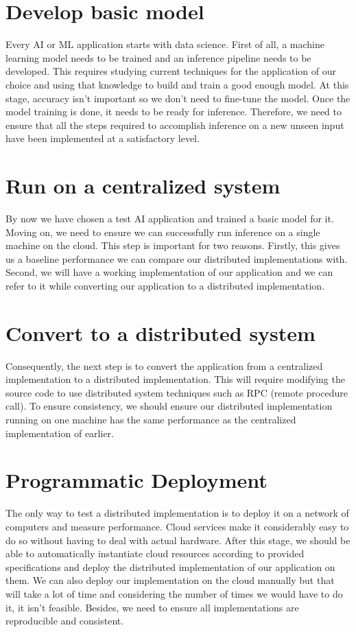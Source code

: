 \documentclass{report}
\begin{document}
\section{Develop basic model}
Every AI or ML application starts with data science. First of all, a machine learning model needs to be trained and an inference pipeline needs to be developed. This requires studying current techniques for the application of our choice and using that knowledge to build and train a good enough model. At this stage, accuracy isn't important so we don't need to fine-tune the model. Once the model training is done, it needs to be ready for inference. Therefore, we need to ensure that all the steps required to accomplish inference on a new unseen input have been implemented at a satisfactory level.

\section{Run on a centralized system}
By now we have chosen a test AI application and trained a basic model for it. Moving on, we need to ensure we can successfully run inference on a single machine on the cloud. This step is important for two reasons. Firstly, this gives us a baseline performance we can compare our distributed implementations with. Second, we will have a working implementation of our application and we can refer to it while converting our application to a distributed implementation.

\section{Convert to a distributed system}
Consequently, the next step is to convert the application from a centralized implementation to a distributed implementation. This will require modifying the source code to use distributed system techniques such as RPC (remote procedure call). To ensure consistency, we should ensure our distributed implementation running on one machine has the same performance as the centralized implementation of earlier.

\section{Programmatic Deployment}
The only way to test a distributed implementation is to deploy it on a network of computers and measure performance. Cloud services make it considerably easy to do so without having to deal with actual hardware. After this stage, we should be able to automatically instantiate cloud resources according to provided specifications and deploy the distributed implementation of our application on them. We can also deploy our implementation on the cloud manually but that will take a lot of time and considering the number of times we would have to do it, it isn't feasible. Besides, we need to ensure all implementations are reproducible and consistent. 
\end{document}
